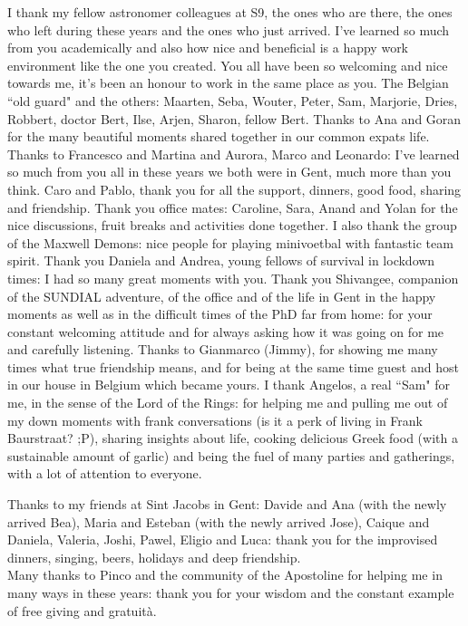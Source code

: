 I thank my fellow astronomer colleagues at S9, the ones who are there, the ones who left during these years and the ones who just arrived.
I've learned so much from you academically and also how nice and beneficial is a happy work environment like the one you created.
You all have been so welcoming and nice towards me, it's been an honour to work in the same place as you.
The Belgian ``old guard" and the others: Maarten, Seba, Wouter, Peter, Sam, Marjorie, Dries, Robbert, doctor Bert, Ilse, Arjen, Sharon, fellow Bert.
Thanks to Ana and Goran for the many beautiful moments shared together in our common expats life.
Thanks to Francesco and Martina and Aurora, Marco and Leonardo: I've learned so much from you all in these years we both were in Gent, much more than you think.
Caro and Pablo, thank you for all the support, dinners, good food, sharing and friendship.
Thank you office mates: Caroline, Sara, Anand and Yolan for the nice discussions, fruit breaks and activities done together.
I also thank the group of the Maxwell Demons: nice people for playing minivoetbal with fantastic team spirit.
Thank you Daniela and Andrea, young fellows of survival in lockdown times: I had so many great moments with you.
Thank you Shivangee, companion of the SUNDIAL adventure, of the office and of the life in Gent in the happy moments as well as in the difficult times of the PhD far from home: for your constant welcoming attitude and for always asking how it was going on for me and carefully listening.
Thanks to Gianmarco (Jimmy), for showing me many times what true friendship means, and for being at the same time guest and host in our house in Belgium which became yours.
I thank Angelos, a real ``Sam" for me, in the sense of the Lord of the Rings: for helping me %
and pulling me out of my down moments with frank conversations (is it a perk of living in Frank Baurstraat? ;P), sharing insights about life, cooking delicious Greek food (with a sustainable amount of garlic) and being the fuel of many parties and gatherings, with a lot of attention to everyone.

Thanks to my friends at Sint Jacobs in Gent: Davide and Ana (with the newly arrived Bea), Maria and Esteban (with the newly arrived Jose), Caique and Daniela, Valeria, Joshi, Pawel, Eligio and Luca: thank you for the improvised dinners, singing, beers, holidays and deep friendship.\\
Many thanks to Pinco and the community of the Apostoline for helping me in many ways in these years: thank you for your wisdom and the constant example of free giving and gratuità.

